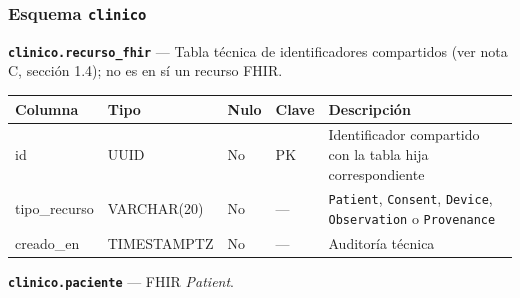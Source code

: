 \documentclass[11pt,a4paper]{article}
\begin{document}
\subsubsection{\texorpdfstring{Esquema \texttt{clinico}}{Esquema clinico}}\label{esquema-clinico}

\textbf{\texttt{clinico.recurso\_fhir}} --- Tabla técnica de identificadores compartidos (ver nota C, sección 1.4); no es en sí un recurso FHIR.

{\small
\begin{longtable}[]{@{}
  >{\raggedright\arraybackslash}p{}
  >{\raggedright\arraybackslash}p{}
  >{\raggedright\arraybackslash}p{}
  >{\raggedright\arraybackslash}p{}
  >{\raggedright\arraybackslash}p{}@{}}
\toprule\noalign{}
\begin{minipage}[b]{\linewidth}\raggedright
Columna
\end{minipage} & \begin{minipage}[b]{\linewidth}\raggedright
Tipo
\end{minipage} & \begin{minipage}[b]{\linewidth}\raggedright
Nulo
\end{minipage} & \begin{minipage}[b]{\linewidth}\raggedright
Clave
\end{minipage} & \begin{minipage}[b]{\linewidth}\raggedright
Descripción
\end{minipage} \\
\midrule\noalign{}
\endhead
\bottomrule\noalign{}
\endlastfoot
id & UUID & No & PK & Identificador compartido con la tabla hija correspondiente \\
tipo\_recurso & VARCHAR(20) & No & --- & \texttt{Patient}, \texttt{Consent}, \texttt{Device}, \texttt{Observation} o \texttt{Provenance} \\
creado\_en & TIMESTAMPTZ & No & --- & Auditoría técnica \\
\end{longtable}
}

\textbf{\texttt{clinico.paciente}} --- FHIR \emph{Patient}.
\end{document}

